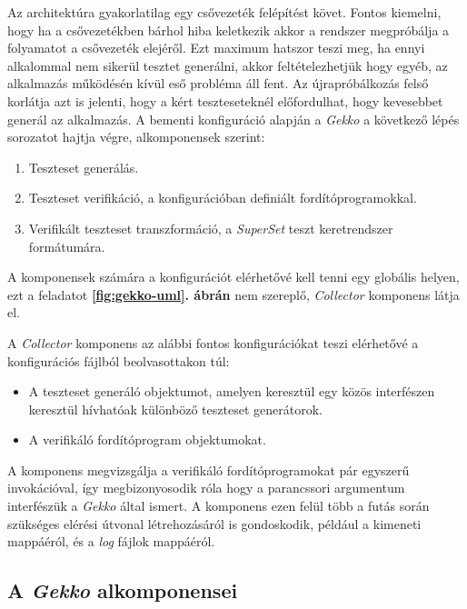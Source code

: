         Az architektúra gyakorlatilag egy csővezeték felépítést követ. Fontos kiemelni, hogy ha a csővezetékben bárhol
        hiba keletkezik akkor a rendszer megpróbálja a folyamatot a csővezeték elejéről. Ezt maximum hatszor teszi meg,
        ha ennyi alkalommal nem sikerül tesztet generálni, akkor feltételezhetjük hogy egyéb, az alkalmazás működésén
        kívül eső probléma áll fent. Az újrapróbálkozás felső korlátja azt is jelenti, hogy a kért teszteseteknél
        előfordulhat, hogy kevesebbet generál az alkalmazás. A bementi konfiguráció alapján a \textit{Gekko} a
        következő lépés sorozatot hajtja végre, alkomponensek szerint:

        \begin{enumerate}
            \item Teszteset generálás.
            \item Teszteset verifikáció, a konfigurációban definiált fordítóprogramokkal.
            \item Verifikált teszteset transzformáció, a \textit{SuperSet} teszt keretrendszer formátumára.
        \end{enumerate}

        A komponensek számára a konfigurációt elérhetővé kell tenni egy globális helyen, ezt a feladatot
        \textbf{\ref{fig:gekko-uml}. ábrán} nem szereplő, \textit{Collector} komponens látja el.

        A \textit{Collector} komponens az alábbi fontos konfigurációkat teszi elérhetővé a konfigurációs fájlból
        beolvasottakon túl:

        \begin{itemize}
            \item A teszteset generáló objektumot, amelyen keresztül egy közös interfészen keresztül hívhatóak
                  különböző teszteset generátorok.
            \item A verifikáló fordítóprogram objektumokat.
        \end{itemize}

        A komponens megvizsgálja a verifikáló fordítóprogramokat pár egyszerű invokációval, így megbizonyosodik róla
        hogy a parancssori argumentum interfészük a \textit{Gekko} által ismert. A komponens ezen felül több a futás
        során szükséges elérési útvonal létrehozásáról is gondoskodik, például a kimeneti mappáéról, és a \textit{log}
        fájlok mappáéról.

    \subsection{A \textit{Gekko} alkomponensei}

